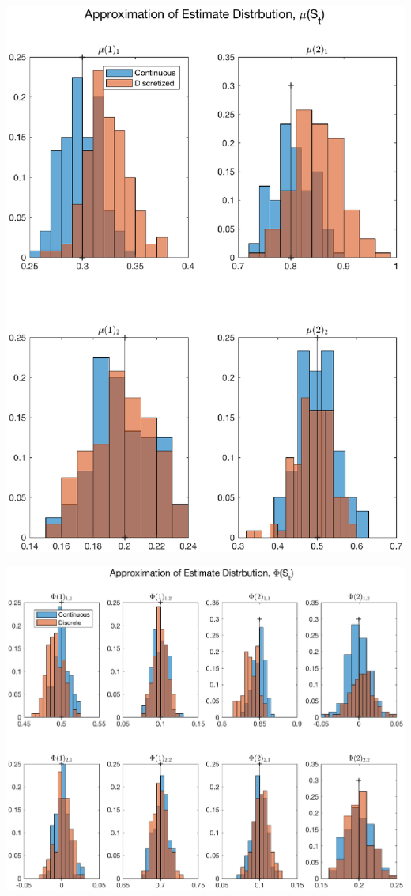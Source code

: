 \documentclass[11pt]{article}
\begin{document}
\includegraphics{fig1}
\newpage

\begin{landscape}
\includegraphics{fig2}
\end{landscape}
\end{document}
